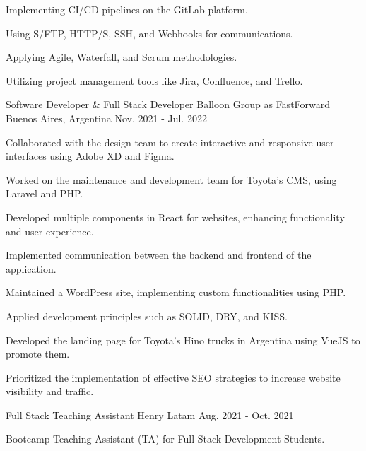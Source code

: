 \begin{cventries}
{\begin{cvitems}
        \item {Implementing CI/CD pipelines on the GitLab platform.}
        \item {Using S/FTP, HTTP/S, SSH, and Webhooks for communications.}
        \item {Applying Agile, Waterfall, and Scrum methodologies.}
        \item {Utilizing project management tools like Jira, Confluence, and Trello.}
      \end{cvitems}
    }
  \vspace{5.5mm}
  \cventry
    {Software Developer \& Full Stack Developer} %
    {Balloon Group as FastForward} %
    {Buenos Aires, Argentina} %
    {Nov. 2021 - Jul. 2022} %
    {
      \begin{cvitems} %
        \item {Collaborated with the design team to create interactive and responsive user interfaces using Adobe XD and Figma.}
        \item {Worked on the maintenance and development team for Toyota's CMS, using Laravel and PHP.}
        \item {Developed multiple components in React for websites, enhancing functionality and user experience.}
        \item {Implemented communication between the backend and frontend of the application.}
        \item {Maintained a WordPress site, implementing custom functionalities using PHP.}
        \item {Applied development principles such as SOLID, DRY, and KISS.}
        \item {Developed the landing page for Toyota's Hino trucks in Argentina using VueJS to promote them.}
        \item {Prioritized the implementation of effective SEO strategies to increase website visibility and traffic.}
      \end{cvitems}
    }
  \vspace{5.5mm}
  \cventry
    {Full Stack Teaching Assistant} %
    {Henry} %
    {Latam} %
    {Aug. 2021 - Oct. 2021} %
    {
      \begin{cvitems} %
        \item {Bootcamp Teaching Assistant (TA) for Full-Stack Development Students.}

\end{cvitems}}
\end{cventries}
